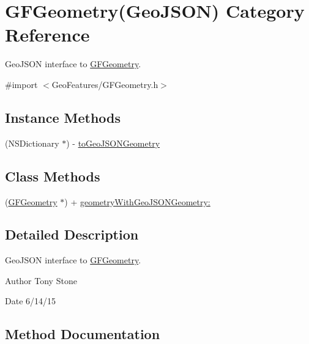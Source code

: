 \hypertarget{category_g_f_geometry_07_geo_j_s_o_n_08}{}\section{G\+F\+Geometry(Geo\+J\+S\+O\+N) Category Reference}
\label{category_g_f_geometry_07_geo_j_s_o_n_08}


Geo\+J\+S\+O\+N interface to \hyperlink{interface_g_f_geometry}{G\+F\+Geometry}.  




{\ttfamily \#import $<$Geo\+Features/\+G\+F\+Geometry.\+h$>$}

\subsection*{Instance Methods}
\begin{DoxyCompactItemize}
\item 
(N\+S\+Dictionary $\ast$) -\/ \hyperlink{category_g_f_geometry_07_geo_j_s_o_n_08_a89a1dd53c1d9a51fd5b933fde28be5b7}{to\+Geo\+J\+S\+O\+N\+Geometry}
\end{DoxyCompactItemize}
\subsection*{Class Methods}
\begin{DoxyCompactItemize}
\item 
(\hyperlink{interface_g_f_geometry}{G\+F\+Geometry} $\ast$) + \hyperlink{category_g_f_geometry_07_geo_j_s_o_n_08_afcdd23bd5dd4b04868d6baf577f9bb32}{geometry\+With\+Geo\+J\+S\+O\+N\+Geometry\+:}
\end{DoxyCompactItemize}


\subsection{Detailed Description}
Geo\+J\+S\+O\+N interface to \hyperlink{interface_g_f_geometry}{G\+F\+Geometry}. 

\begin{DoxyAuthor}{Author}
Tony Stone 
\end{DoxyAuthor}
\begin{DoxyDate}{Date}
6/14/15 
\end{DoxyDate}


\subsection{Method Documentation}
\hypertarget{category_g_f_geometry_07_geo_j_s_o_n_08_afcdd23bd5dd4b04868d6baf577f9bb32}{}
